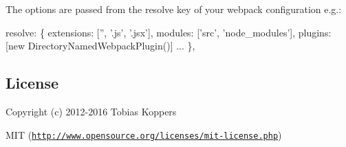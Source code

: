 The options are passed from the {\ttfamily resolve} key of your webpack configuration e.\+g.\+:


\begin{DoxyCode}
resolve: \{
  extensions: ['', '.js', '.jsx'],
  modules: ['src', 'node\_modules'],
  plugins: [new DirectoryNamedWebpackPlugin()]
  ...
\},
\end{DoxyCode}


\subsection*{License}

Copyright (c) 2012-\/2016 Tobias Koppers

M\+IT (\href{http://www.opensource.org/licenses/mit-license.php}{\tt http\+://www.\+opensource.\+org/licenses/mit-\/license.\+php}) 